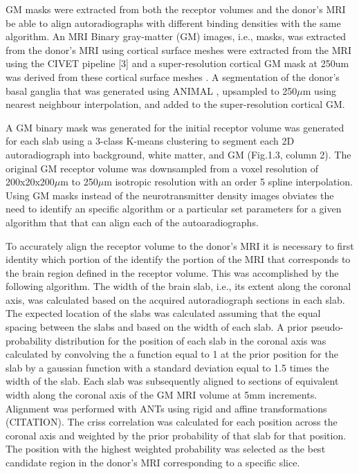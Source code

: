 \documentclass[12pt]{article}
\begin{document}
    GM masks were extracted from both the receptor volumes and the donor's MRI be able to align autoradiographs with different binding densities with the same algorithm. An MRI Binary gray-matter (GM) images, i.e., masks, was extracted from the donor's MRI using cortical surface meshes were extracted from the MRI using the CIVET pipeline [3] and a super-resolution cortical GM mask at 250um was derived from these cortical surface meshes \cite{Funck2014}. A segmentation of the donor's basal ganglia that was generated using ANIMAL \cite{Collins1995}, upsampled to 250$\mu$m using nearest neighbour interpolation, and added to the super-resolution cortical GM. 

    A GM binary mask was generated for the initial receptor volume was generated for each slab using a 3-class K-means clustering to segment each 2D autoradiograph into background, white matter, and GM (Fig.1.3, column 2). The original GM receptor volume was downsampled from a voxel resolution of 200x20x200$\mu$m to 250$\mu$m isotropic resolution with an order 5 spline interpolation. Using GM masks instead of the neurotransmitter density images obviates the need to identify an specific algorithm or a particular set parameters for a given algorithm that that can align each of the autoaradiographs. 
    
    To accurately align the receptor volume to the donor's MRI it is necessary to first identity which portion of the identify the portion of the MRI that corresponds to the brain region defined in the receptor volume. This was accomplished by the following algorithm. The width of the brain slab, i.e., its extent along the coronal axis, was calculated based on the acquired autoradiograph sections in each slab. The expected location of the slabs was calculated assuming that the equal spacing between the slabs and based on the width of each slab. A prior pseudo-probability distribution for the position of each slab in the coronal axis was calculated by convolving the a function equal to 1 at the prior position for the slab by a gaussian function with a standard deviation equal to  1.5 times the width of the slab. Each slab was subsequently aligned to sections of equivalent width along the coronal axis of the GM MRI volume at 5mm increments. Alignment was performed with ANTs using rigid and affine transformations (CITATION). The criss correlation was calculated for each position across the coronal axis and weighted by the prior probability of that slab for that position. The position with the highest weighted probability was selected as the best candidate region in the donor's MRI corresponding to a specific slice. 
    
\end{document}
